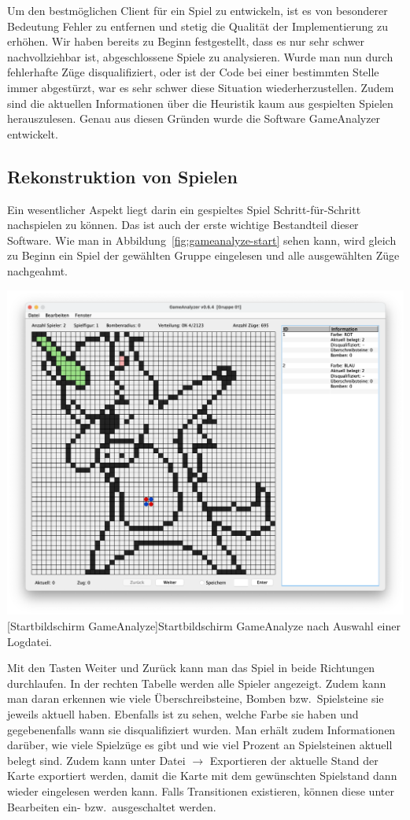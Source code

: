 Um den bestm\"oglichen Client f\"ur ein Spiel zu entwickeln, ist es von besonderer Bedeutung Fehler zu entfernen und stetig die Qualit\"at der Implementierung zu erh\"ohen.
Wir haben bereits zu Beginn festgestellt, dass es nur sehr schwer nachvollziehbar ist, abgeschlossene Spiele zu analysieren.
Wurde man nun durch fehlerhafte Z\"uge disqualifiziert, oder ist der Code bei einer bestimmten Stelle immer abgest\"urzt, war es sehr schwer diese Situation wiederherzustellen.
Zudem sind die aktuellen Informationen \"uber die Heuristik kaum aus gespielten Spielen herauszulesen.
Genau aus diesen Gr\"unden wurde die Software GameAnalyzer entwickelt.

\subsection{Rekonstruktion von Spielen}\label{subsec:rekonstruktion-von-spielen}
Ein wesentlicher Aspekt liegt darin ein gespieltes Spiel Schritt-f\"ur-Schritt nachspielen zu k\"onnen.
Das ist auch der erste wichtige Bestandteil dieser Software.
Wie man in Abbildung~\ref{fig:gameanalyze-start} sehen kann, wird gleich zu Beginn ein Spiel der gew\"ahlten Gruppe eingelesen und alle ausgew\"ahlten Z\"uge nachgeahmt.

\vspace{1em}
\begin{minipage}{\linewidth}
    \centering
    \includegraphics[width=0.8\linewidth]{pics/startscreen}
    [Startbildschirm GameAnalyze]{Startbildschirm GameAnalyze nach Auswahl einer Logdatei.}
    \label{fig:gameanalyze-start}
\end{minipage}

Mit den Tasten Weiter und Zur\"uck kann man das Spiel in beide Richtungen durchlaufen.
In der rechten Tabelle werden alle Spieler angezeigt.
Zudem kann man daran erkennen wie viele \"Uberschreibsteine, Bomben bzw.\ Spielsteine sie jeweils aktuell haben.
Ebenfalls ist zu sehen, welche Farbe sie haben und gegebenenfalls wann sie disqualifiziert wurden.
Man erh\"alt zudem Informationen dar\"uber, wie viele Spielz\"uge es gibt und wie viel Prozent an Spielsteinen aktuell belegt sind.
Zudem kann unter Datei $\rightarrow$ Exportieren der aktuelle Stand der Karte exportiert werden, damit die Karte mit dem gew\"unschten Spielstand dann wieder eingelesen werden kann.
Falls Transitionen existieren, k\"onnen diese unter Bearbeiten ein- bzw.\ ausgeschaltet werden.

